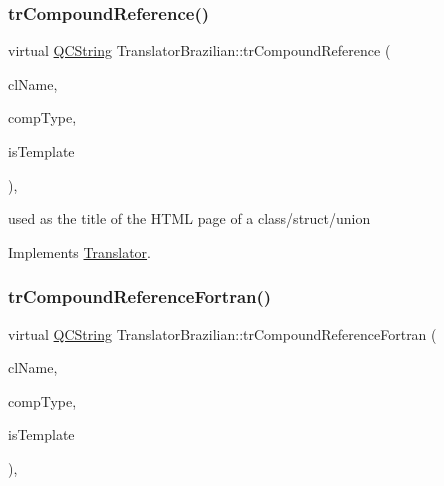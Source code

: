 \mbox{\label{class_translator_brazilian_a0e0b8f5de5c6b8c8a7800caef7664f8c}} 
\subsubsection{\texorpdfstring{trCompoundReference()}{trCompoundReference()}}
{\footnotesize\ttfamily virtual \mbox{\hyperlink{class_q_c_string}{Q\+C\+String}} Translator\+Brazilian\+::tr\+Compound\+Reference (\begin{DoxyParamCaption}\item[{const char $\ast$}]{cl\+Name,  }\item[{\mbox{\hyperlink{class_class_def_ae70cf86d35fe954a94c566fbcfc87939}{Class\+Def\+::\+Compound\+Type}}}]{comp\+Type,  }\item[{bool}]{is\+Template }\end{DoxyParamCaption})\hspace{0.3cm}{\ttfamily [inline]}, {\ttfamily [virtual]}}

used as the title of the H\+T\+ML page of a class/struct/union 

Implements \mbox{\hyperlink{class_translator}{Translator}}.

\mbox{\label{class_translator_brazilian_ae4e7b8e9922552e8d7fd8eed2ae18521}} 
\subsubsection{\texorpdfstring{trCompoundReferenceFortran()}{trCompoundReferenceFortran()}}
{\footnotesize\ttfamily virtual \mbox{\hyperlink{class_q_c_string}{Q\+C\+String}} Translator\+Brazilian\+::tr\+Compound\+Reference\+Fortran (\begin{DoxyParamCaption}\item[{const char $\ast$}]{cl\+Name,  }\item[{\mbox{\hyperlink{class_class_def_ae70cf86d35fe954a94c566fbcfc87939}{Class\+Def\+::\+Compound\+Type}}}]{comp\+Type,  }\item[{bool}]{is\+Template }\end{DoxyParamCaption})\hspace{0.3cm}{\ttfamily [inline]}, {\ttfamily [virtual]}}

